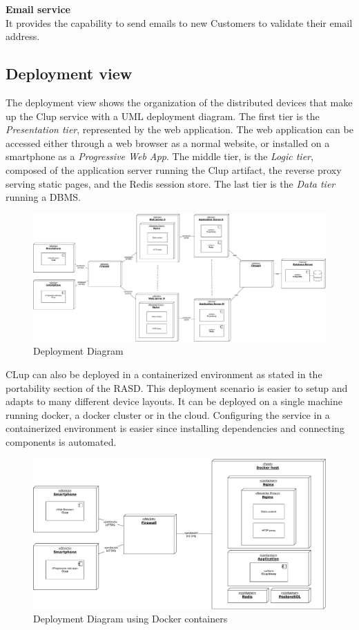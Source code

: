 \textbf{Email service}\\ It provides the capability to send emails to new Customers to validate their email address.


\subsection{Deployment view}
The deployment view shows the organization of the distributed devices that make up the Clup service with a UML deployment diagram. The first tier is the \emph{Presentation tier}, represented by the web application. The web application can be accessed either through a web browser as a normal website, or installed on a smartphone as a \emph{Progressive Web App}. The middle tier, is the \emph{Logic tier}, composed of the application server running the Clup artifact, the reverse proxy serving static pages, and the Redis session store. The last tier is the \emph{Data tier} running a DBMS.
\begin{figure}[H]
    \centering
    \includegraphics[width=1\textwidth]{Images/deployment-1.pdf}
    \caption{Deployment Diagram}
\end{figure}
CLup can also be deployed in a containerized environment as stated in the portability section of the RASD. This deployment scenario is easier to setup and adapts to many different device layouts. It can be deployed on a single machine running docker, a docker cluster or in the cloud. Configuring the service in a containerized environment is easier since installing dependencies and connecting components is automated.
\begin{figure}[H]
    \centering
    \includegraphics[width=1\textwidth]{Images/deployment-2.pdf}
    \caption{Deployment Diagram using Docker containers}
\end{figure}

